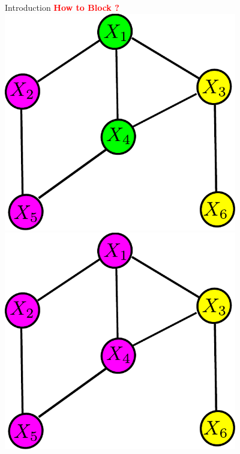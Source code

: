 \documentclass[serif,mathserif,final]{beamer}
\newcommand{\itemlinespace}{0.3in}
\newcommand{\paralinespace}{0.6in}
\newcommand{\insertlinespace}{\vspace{\itemlinespace}}
\newcommand{\insertparaspace}{\vspace{\paralinespace}}
\newcommand{\semititle}[1]{\textcolor{red}{\Huge \textbf{#1}}}
\begin{document}
\begin{frame}{}
\begin{columns}[t]
\begin{column}{0.49\linewidth}
\begin{block}{\Huge Introduction}
{        \insertparaspace
        \semititle{How to Block ?} \\
          \insertlinespace
          \newcommand{\localimgwidtha}{4in}
          \hspace{0.5in}
          \includegraphics[width=\localimgwidtha]{figs/bg1} \hspace{0.5in}
          \includegraphics[width=\localimgwidtha]{figs/bg2} \hspace{0.5in} 
}
\end{block}
\end{column}
\end{columns}
\end{frame}
\end{document}
